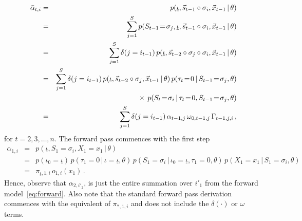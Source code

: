 \documentclass[a4paper]{article}
\begin{document}
\begin{eqnarray}
   \bar{\alpha}_{t,i} & = & p(\underline{\iota},\vec{s}_{t-1}\circ\sigma_{i},\vec{x}_{t-1}\,|\,\theta) 
\nonumber\\& = &
   \sum_{j=1}^{S}p(S_{t-1}\!=\!\sigma_j,\underline{\iota},\vec{s}_{t-1}\circ\sigma_{i},\vec{x}_{t-1}\,|\,\theta) 
\nonumber\\& = &
   \sum_{j=1}^{S}\delta(j=i_{t-1})\,p(\underline{\iota},\vec{s}_{t-2}\circ\sigma_{j}\circ\sigma_{i},\vec{x}_{t-1}\,|\,\theta) 
\nonumber\\& = &
   \sum_{j=1}^{S}\delta(j=i_{t-1})\,p(\underline{\iota},\vec{s}_{t-2}\circ\sigma_{j},\vec{x}_{t-1}\,|\,\theta) 
      \,p(\tau_t\!=\!0\,|\,S_{t-1}\!=\!\sigma_j,\theta)
\nonumber\\&&
    \hspace*{5mm}{}\times\,p(S_t\!=\!\sigma_i\,|\,\tau_{t}\!=\!0,S_{t-1}\!=\!\sigma_j,\theta)
\nonumber\\& = &
   \sum_{j=1}^{S}\delta(j=i_{t-1})\,\alpha_{t-1,j}\,\omega_{0,t-1,j}\,\Gamma_{t-1,j,i}\,,
\label{eq:alpha-bar}
\end{eqnarray}
for $t=2,3,\ldots,n$. The forward pass commences with the first step
\begin{eqnarray}
  \alpha_{1,i} & = & p(\underline{\iota},S_1=\sigma_{i},X_1\!=\!x_1\,|\,\theta) 
\nonumber\\& = & 
  p(\iota_0\!=\!\underline{\iota})\,p(\tau_1\!=\!0\,|\,\iota\!=\!\underline{\iota},\theta)
\,p(S_1\!=\!\sigma_i\,|\,\iota_0\!=\!\underline{\iota},\tau_1\!=\!0,\theta)\,p(X_1\!=\!x_1\,|\,S_1\!=\!\sigma_i,\theta)
\nonumber\\& = & 
  \pi_{\underline{\iota},1,i}\,o_{1,i}(x_1)
\,.
\label{eq:alpha_1}
\end{eqnarray}
Hence, observe that $\alpha_{2,i'_2}$, is just
the entire summation over $i'_1$ from the forward model~\eqref{eq:forward}.
Also note that the standard forward pass derivation commences with the equivalent of $\pi_{*,1,i}$ and does not include the
$\delta(\cdot)$ or $\omega$ terms.
\end{document}
